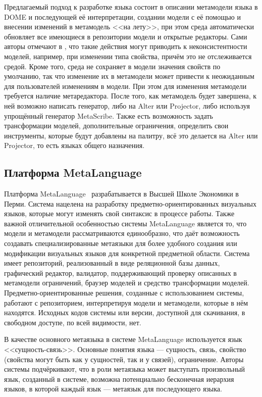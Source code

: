 Предлагаемый подход к разработке языка состоит в описании метамодели языка в DOME и последующей
её интерпретации, создании модели с её помощью и внесении изменений в метамодель <<на лету>>,
при этом среда автоматически обновляет все имеющиеся в репозитории модели и открытые редакторы.
Сами авторы отмечают в \cite{guide1999honeywell}, что такие действия могут приводить к 
неконсистентности моделей, например, при изменении типа свойства, причём это не отслеживается средой.
Кроме того, среда не сохраняет в модели значения свойств по умолчанию, так что изменение их в
метамодели может привести к неожиданным для пользователей изменениям в модели. При
этом для изменения метамодели требуется наличие метаредактора. После того, как метамодель
будет завершена, к ней возможно написать генератор, либо на Alter или Projector, либо используя
упрощённый генератор MetaScribe. Также есть возможность задать трансформации моделей, 
дополнительные ограничения, определить свои инструменты, которые будут добавлены на палитру,
всё это делается на Alter или Projector, то есть языках общего назначения.

\subsection{Платформа MetaLanguage}
Платформа MetaLanguage~\cite{sukhov2012approach, lyadova2008language, lyadova2010instruments, sukhov2013disser}
разрабатывается в Высшей Школе Экономики в Перми. Система нацелена на разработку предметно-ориентированных
визуальных языков, которые могут изменять свой синтаксис в процессе работы. Также важной
отличительной особенностью системы MetaLanguage является то, что модели и метамодели рассматриваются
единообразно, что даёт возможность создавать специализированные метаязыки для более удобного
создания или модификации визуальных языков для конкретной предметной области. Система
имеет репозиторий, реализованный в виде реляционной базы данных, графический редактор, валидатор,
поддерживающий проверку описанных в метамодели ограничений, браузер моделей и средство трансформации
моделей. Предметно-ориентированные решения, созданные с использованием системы, работают
с репозиторием, интерпретируя модели и метамодели, которые в нём находятся. Исходных кодов системы 
или версии, доступной для скачивания, в свободном доступе, по всей видимости, нет.

В качестве основного метаязыка в системе MetaLanguage используется язык <<сущность-связь>>. Основные понятия языка ---
сущность, связь, свойство (свойства могут быть как у сущностей, так и у связей), ограничение.
Авторы системы подчёркивают, что в роли метаязыка может выступать произвольный язык, созданный в системе,
возможна потенциально бесконечная иерархия языков, в которой каждый язык ---
метаязык для последующего языка.

